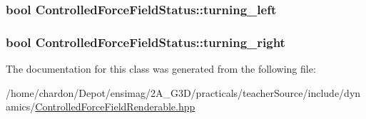 \hypertarget{classControlledForceFieldStatus_a264806403b30bbd69d4df3da794a43c5}{
\subsubsection[{turning\+\_\+left}]{\setlength{\rightskip}{0pt plus 5cm}bool Controlled\+Force\+Field\+Status\+::turning\+\_\+left}}\label{classControlledForceFieldStatus_a264806403b30bbd69d4df3da794a43c5}
\hypertarget{classControlledForceFieldStatus_abc4f6de46a552f7ca74c47a2c6e10c5e}{
\subsubsection[{turning\+\_\+right}]{\setlength{\rightskip}{0pt plus 5cm}bool Controlled\+Force\+Field\+Status\+::turning\+\_\+right}}\label{classControlledForceFieldStatus_abc4f6de46a552f7ca74c47a2c6e10c5e}


The documentation for this class was generated from the following file\+:\begin{DoxyCompactItemize}
\item 
/home/chardon/\+Depot/ensimag/2\+A\+\_\+\+G3\+D/practicals/teacher\+Source/include/dynamics/\hyperlink{ControlledForceFieldRenderable_8hpp}{Controlled\+Force\+Field\+Renderable.\+hpp}\end{DoxyCompactItemize}
